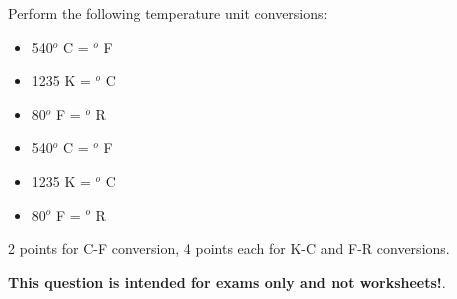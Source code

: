 

Perform the following temperature unit conversions:

\begin{itemize}
\item{} 540$^{o}$ C = \underbar{\hskip 50pt} $^{o}$ F
\vskip 5pt
\item{} 1235 K = \underbar{\hskip 50pt} $^{o}$ C
\vskip 5pt
\item{} 80$^{o}$ F = \underbar{\hskip 50pt} $^{o}$ R
\end{itemize}







\begin{itemize}
\item{} 540$^{o}$ C = $^{o}$ F
\vskip 5pt
\item{} 1235 K = $^{o}$ C
\vskip 5pt
\item{} 80$^{o}$ F = $^{o}$ R
\end{itemize}

2 points for C-F conversion, 4 points each for K-C and F-R conversions.







{\bf This question is intended for exams only and not worksheets!}.



